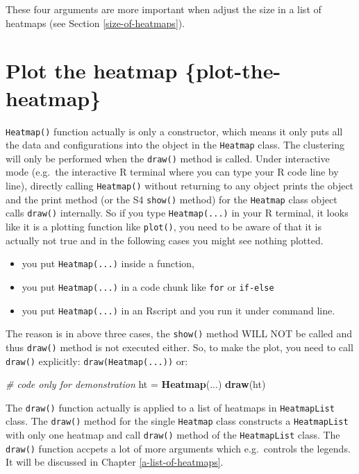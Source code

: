 \documentclass[]{book}
\newenvironment{Shaded}{\begin{snugshade}}{\end{snugshade}}
\newcommand{\KeywordTok}[1]{\textcolor[rgb]{0.13,0.29,0.53}{\textbf{#1}}}
\newcommand{\StringTok}[1]{\textcolor[rgb]{0.31,0.60,0.02}{#1}}
\newcommand{\CommentTok}[1]{\textcolor[rgb]{0.56,0.35,0.01}{\textit{#1}}}
\newcommand{\NormalTok}[1]{#1}
\providecommand{\tightlist}{%
  \setlength{\itemsep}{0pt}\setlength{\parskip}{0pt}}
\theoremstyle{definition}
\theoremstyle{definition}
\theoremstyle{definition}
\theoremstyle{remark}
\begin{document}
These four arguments are more important when adjust the size in a list
of heatmaps (see Section \ref{size-of-heatmaps}).

\section{Plot the heatmap
\{plot-the-heatmap\}}\label{plot-the-heatmap-plot-the-heatmap}

\texttt{Heatmap()} function actually is only a constructor, which means
it only puts all the data and configurations into the object in the
\texttt{Heatmap} class. The clustering will only be performed when the
\texttt{draw()} method is called. Under interactive mode (e.g.~the
interactive R terminal where you can type your R code line by line),
directly calling \texttt{Heatmap()} without returning to any object
prints the object and the print method (or the S4 \texttt{show()}
method) for the \texttt{Heatmap} class object calls \texttt{draw()}
internally. So if you type \texttt{Heatmap(...)} in your R terminal, it
looks like it is a plotting function like \texttt{plot()}, you need to
be aware of that it is actually not true and in the following cases you
might see nothing plotted.

\begin{itemize}
\tightlist
\item
  you put \texttt{Heatmap(...)} inside a function,
\item
  you put \texttt{Heatmap(...)} in a code chunk like \texttt{for} or
  \texttt{if-else}
\item
  you put \texttt{Heatmap(...)} in an Rscript and you run it under
  command line.
\end{itemize}

The reason is in above three cases, the \texttt{show()} method WILL NOT
be called and thus \texttt{draw()} method is not executed either. So, to
make the plot, you need to call \texttt{draw()} explicitly:
\texttt{draw(Heatmap(...))} or:

\begin{Shaded}
\begin{Highlighting}[]
\CommentTok{# code only for demonstration}
\NormalTok{ht =}\StringTok{ }\KeywordTok{Heatmap}\NormalTok{(...)}
\KeywordTok{draw}\NormalTok{(ht)}
\end{Highlighting}
\end{Shaded}

The \texttt{draw()} function actually is applied to a list of heatmaps
in \texttt{HeatmapList} class. The \texttt{draw()} method for the single
\texttt{Heatmap} class constructs a \texttt{HeatmapList} with only one
heatmap and call \texttt{draw()} method of the \texttt{HeatmapList}
class. The \texttt{draw()} function accpets a lot of more arguments
which e.g.~controls the legends. It will be discussed in Chapter
\ref{a-list-of-heatmaps}.
\end{document}
